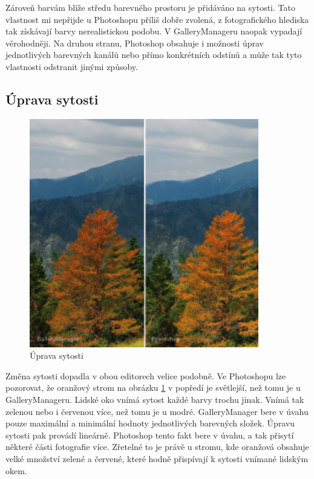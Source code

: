 \documentclass[11pt,twoside,a4paper]{book}
\begin{document}
\indent
Zároveň barvám blíže středu barevného prostoru je přidáváno na sytosti. Tato vlastnost mi nepřijde u Photoshopu příliš dobře zvolená, z fotografického hlediska tak získávají barvy nerealistickou podobu. V GalleryManageru naopak vypadají věrohodněji. Na druhou stranu, Photoshop obsahuje i možnosti úprav jednotlivých barevných kanálů nebo přímo konkrétních odstínů a může tak tyto vlastnosti odstranit jinými způsoby.


\subsection{Úprava sytosti}
\begin{figure}[ht]
\begin{center}
\includegraphics[width=10cm]{figures/saturation}
\caption{Úprava sytosti}
\label{fig:saturation}
\end{center}
\end{figure}

\noindent
Změna sytosti dopadla v obou editorech velice podobně. Ve Photoshopu lze pozorovat, že oranžový strom na obrázku \ref{fig:saturation} v popředí je světlejší, než tomu je u GalleryManageru. Lidské oko vnímá sytost každé barvy trochu jinak. Vnímá tak zelenou nebo i červenou více, než tomu je u modré. GalleryManager bere v úvahu pouze maximální a minimální hodnoty jednotlivých barevných složek. Úpravu sytosti pak provádí lineárně. Photoshop tento fakt bere v úvahu, a tak přisytí některé části fotografie více. Zřetelné to je právě u stromu, kde oranžová obsahuje velké množství zelené a červené, které hodně přispívají k sytosti vnímané lidským okem.
\end{document}
